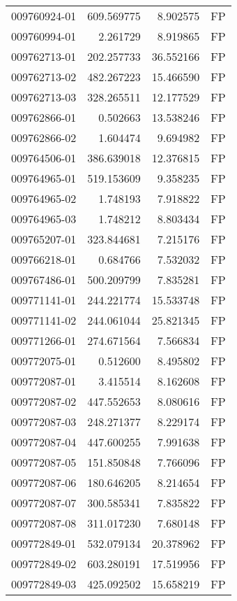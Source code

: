 \begin{tabular}{lrrl}
009760924-01 &  609.569775 &     8.902575 &   FP \\
009760994-01 &    2.261729 &     8.919865 &   FP \\
009762713-01 &  202.257733 &    36.552166 &   FP \\
009762713-02 &  482.267223 &    15.466590 &   FP \\
009762713-03 &  328.265511 &    12.177529 &   FP \\
009762866-01 &    0.502663 &    13.538246 &   FP \\
009762866-02 &    1.604474 &     9.694982 &   FP \\
009764506-01 &  386.639018 &    12.376815 &   FP \\
009764965-01 &  519.153609 &     9.358235 &   FP \\
009764965-02 &    1.748193 &     7.918822 &   FP \\
009764965-03 &    1.748212 &     8.803434 &   FP \\
009765207-01 &  323.844681 &     7.215176 &   FP \\
009766218-01 &    0.684766 &     7.532032 &   FP \\
009767486-01 &  500.209799 &     7.835281 &   FP \\
009771141-01 &  244.221774 &    15.533748 &   FP \\
009771141-02 &  244.061044 &    25.821345 &   FP \\
009771266-01 &  274.671564 &     7.566834 &   FP \\
009772075-01 &    0.512600 &     8.495802 &   FP \\
009772087-01 &    3.415514 &     8.162608 &   FP \\
009772087-02 &  447.552653 &     8.080616 &   FP \\
009772087-03 &  248.271377 &     8.229174 &   FP \\
009772087-04 &  447.600255 &     7.991638 &   FP \\
009772087-05 &  151.850848 &     7.766096 &   FP \\
009772087-06 &  180.646205 &     8.214654 &   FP \\
009772087-07 &  300.585341 &     7.835822 &   FP \\
009772087-08 &  311.017230 &     7.680148 &   FP \\
009772849-01 &  532.079134 &    20.378962 &   FP \\
009772849-02 &  603.280191 &    17.519956 &   FP \\
009772849-03 &  425.092502 &    15.658219 &   FP \\

\end{tabular}
